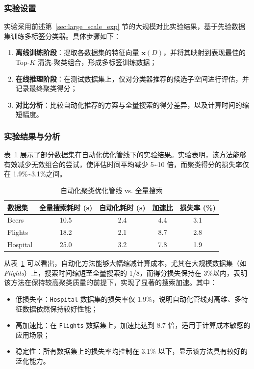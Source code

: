 \documentclass[10pt]{article} %
\numberwithin{equation}{section}
\begin{document}
\subsubsection{实验设置}
\label{sec:exp_setting_automl}
实验采用前述第~\ref{sec:large_scale_exp} 节的大规模对比实验结果，基于先验数据集训练多标签分类器。具体步骤如下：
\begin{enumerate}
    \item \textbf{离线训练阶段}：提取各数据集的特征向量 \(\mathbf{x}(D)\)，并将其映射到表现最佳的 Top-$K$ 清洗-聚类组合，形成多标签训练数据；
    \item \textbf{在线推理阶段}：在测试数据集上，仅对分类器推荐的候选子空间进行评估，并记录最终聚类得分；
    \item \textbf{对比分析}：比较自动化推荐的方案与全量搜索的得分差异，以及计算时间的缩短幅度。
\end{enumerate}

\subsubsection{实验结果与分析}
\label{sec:res_analysis_automl}

表~\ref{tab:autoML_res} 展示了部分数据集在自动化优化管线下的实验结果。实验表明，该方法能够有效减少无效组合的尝试，使评估时间平均减少 5\textasciitilde10 倍，而聚类得分的损失率仅在 1.9\%\textasciitilde3.1\%之间。

\begin{table}[htbp]
\centering
\caption{自动化聚类优化管线 vs. 全量搜索}
\label{tab:autoML_res}
\begin{tabular}{lcccc}
\toprule
\textbf{数据集} & \textbf{全量搜索耗时 (s)} & \textbf{自动化耗时 (s)} & \textbf{加速比} & \textbf{损失率 (\%)} \\
\midrule
Beers & 10.5 & 2.4 & 4.4 & 3.1 \\
Flights & 18.2 & 2.1 & 8.7 & 2.8 \\
Hospital & 25.0 & 3.2 & 7.8 & 1.9 \\
\bottomrule
\end{tabular}
\end{table}

\noindent
从表~\ref{tab:autoML_res} 可以看出，自动化方法能够大幅缩减计算成本，尤其在大规模数据集（如 \textit{Flights}）上，搜索时间缩短至全量搜索的 1/8，而得分损失保持在 3\%以内，表明该方法在保持较高聚类质量的前提下，实现了显著的搜索加速。其中：
\begin{itemize}
    \item 低损失率：\texttt{Hospital} 数据集的损失率仅 1.9\%，说明自动化管线对高维、多特征数据依然保持较好性能；
    \item 高加速比：在 \texttt{Flights} 数据集上，加速比达到 8.7 倍，适用于计算成本敏感的应用场景；
    \item 稳定性：所有数据集上的损失率均控制在 3.1\% 以下，显示该方法具有较好的泛化能力。
\end{itemize}
\end{document}
